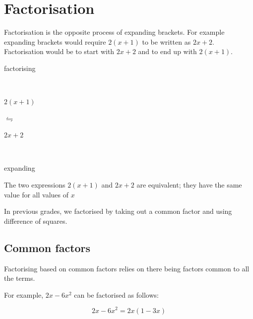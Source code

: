 \section{Factorisation}


Factorisation is the opposite process of expanding brackets. For example expanding brackets would require $2(x+1)$ to be written as $2x+2$. Factorisation would be to start with $2x+2$ and to end up with $2(x+1)$. 

\Identity
{
\begin{center}
\begin{small}\hspace{8pt}factorising\end{small}\\
\begin{Large}
$2(x+1)$ \begin{Huge} $\leftrightharpoons$ \end{Huge} $2x+2$
\end{Large}\\
\begin{small}\hspace{8pt}expanding\end{small}
\end{center}
}

The two expressions $2(x+1)$ and $2x+2$ are equivalent; they have the same value for all values of $x$


\par
In previous grades, we factorised by taking out a common factor and using difference of squares.\par 

\subsection*{Common factors}

Factorising based on common factors relies on there being factors common to all the terms. \par

For example, $2x-6{x}^{2}$ can be factorised as follows:\par 

\begin{equation*}
2x-6{x}^{2}=2x(1-3x)
\end{equation*}



